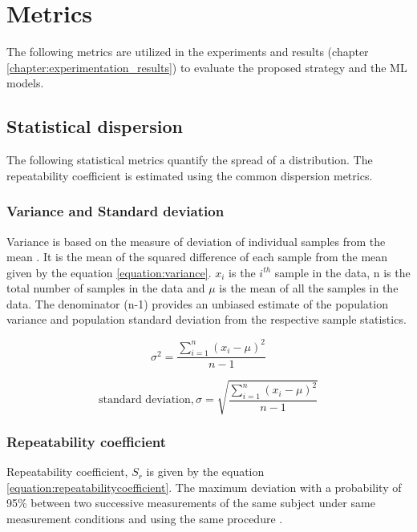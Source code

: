 \section{Metrics}

The following metrics are utilized in the experiments and results (chapter \ref{chapter:experimentation_results}) to evaluate the proposed strategy and the ML models.

\subsection{Statistical dispersion}
The following statistical metrics quantify the spread of a distribution. The repeatability coefficient is estimated using the common dispersion metrics.
\subsubsection{Variance and Standard deviation}
Variance is based on the measure of deviation of individual samples from the mean \cite{statistic_definition}. It is the mean of the squared difference of each sample from the mean given by the equation \ref{equation:variance}. $x_i$ is the $i^{th}$ sample in the data, n is the total number of samples in the data and $\mu$ is the mean of all the samples in the data. The denominator (n-1) provides an unbiased estimate of the population variance and population standard deviation from the respective sample statistics.

\begin{equation}
\sigma^{2}=\frac{\sum_{i=1}^{n}(x_i-\mu)^{2}}{n-1}
\label{equation:variance}
\end{equation}

\begin{equation}
\text{standard deviation},\sigma=\sqrt{\frac{\sum_{i=1}^{n}(x_i-\mu)^{2}}{n-1}}
\label{equation:standarddeviation}
\end{equation}

\subsubsection{Repeatability coefficient}
\label{section:repeatability_coeff}
Repeatability coefficient, $S_r$ is given by the equation \ref{equation:repeatabilitycoefficient}. The maximum deviation with a probability of 95\% between two successive measurements of the same subject under same measurement conditions and using the same procedure \cite{repeatability1} \cite{repeatability2}.

